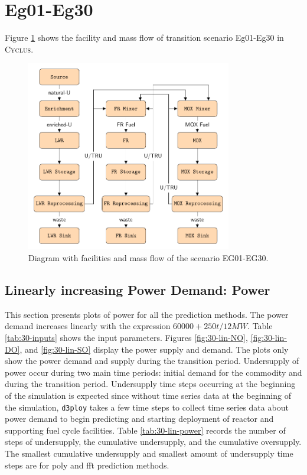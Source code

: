 \documentclass[11pt]{article}
\newcommand{\Cyclus}{\textsc{Cyclus}\xspace}%
\newcommand{\deploy}{\texttt{d3ploy}\xspace}%
\begin{document}
\section{Eg01-Eg30}

Figure \ref{fig:30flow} shows the facility and mass flow of transition scenario 
Eg01-Eg30 in \Cyclus.

\begin{figure}[H]
	\centering
	\includegraphics[width=0.8\textwidth]{30-figures/30flow.pdf} 
	\hfill
	\caption{Diagram with facilities and mass flow of the scenario EG01-EG30.}
	\label{fig:30flow}
\end{figure}

\subsection{Linearly increasing Power Demand: Power}

This section presents plots of power for all the prediction methods. 
The power demand increases linearly with the expression $60000 + 250t/12 MW$. 
Table \ref{tab:30-inputs} shows the input parameters. 
Figures \ref{fig:30-lin-NO}, \ref{fig:30-lin-DO}, and \ref{fig:30-lin-SO} 
display the power supply and demand. 
The plots only show the power demand and supply during the transition period. 
Undersupply of power occur during two main time periods:  
initial demand for the commodity and during the transition period. 
Undersupply time steps occurring at the beginning of the simulation 
is expected since without time series data at the beginning of the simulation, 
\deploy takes a few time steps to collect time series data about power demand 
to begin predicting and starting deployment of reactor and supporting fuel 
cycle facilities. 
Table \ref{tab:30-lin-power} records the number of steps of undersupply, 
the cumulative undersupply, and the cumulative oversupply. 
The smallest cumulative undersupply and smallest amount of undersupply 
time steps are for poly and fft prediction methods. 
\end{document}
